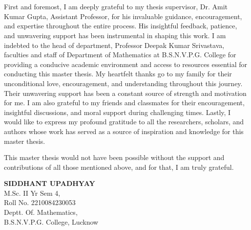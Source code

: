 \documentclass[14pt,one side, a4paper]{extbook}
\begin{document}
		\chapter* {}
		\begin{Large}
		First and foremost, I am deeply grateful to my thesis supervisor, Dr. Amit Kumar Gupta, Assistant Professor, for his invaluable guidance, encouragement, and expertise throughout the entire process. His insightful feedback, patience, and unwavering support has been instrumental in shaping this work. I am indebted to the head of department, Professor Deepak Kumar Srivastava,  faculties and staff of Department of Mathematics at B.S.N.V.P.G. College for providing a conducive academic environment and access to resources essential for conducting this master thesis.
		My heartfelt thanks go to my family for their unconditional love, encouragement, and understanding throughout this journey. Their unwavering support has been a constant source of strength and motivation for me.
		I am also grateful to my friends and classmates for their encouragement, insightful discussions, and moral support during challenging times.
		Lastly, I would like to express my profound gratitude to all the researchers, scholars, and authors whose work has served as a source of inspiration and knowledge for this master thesis.
		
		This master thesis would not have been possible without the support and contributions of all those mentioned above, and for that, I am truly grateful.
		\end{Large}\vspace{3cm}
		\begin{flushright}
			\textbf{SIDDHANT UPADHYAY}\\M.Sc. II Yr Sem 4,\\Roll No. 2210084230053\\Deptt. Of. Mathematics, \\B.S.N.V.P.G. College, Lucknow
		\end{flushright}
\end{document}
